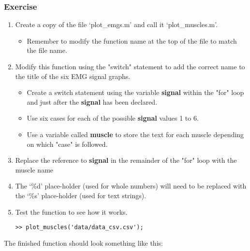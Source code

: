 \documentclass[12pt,a4paper]{article}
\begin{document}
\subsubsection*{Exercise}
\begin{enumerate}
	\item Create a copy of the file `plot\_emgs.m' and call it `plot\_muscles.m'.
	\begin{itemize}
		\item Remember to modify the function name at the top of the file to match the file name.
	\end{itemize}
	\item Modify this function using the "switch" statement to add the correct name to the title of the six EMG signal graphs.
	\begin{itemize}
		\item Create a switch statement using the variable \textbf{signal} within the "for" loop and just after the \textbf{signal} has been declared.
		\item Use six cases for each of the possible \textbf{signal} values 1 to 6.
		\item Use a variable called \textbf{muscle} to store the text for each muscle depending on which "case" is followed.
	\end{itemize}
	\item Replace the reference to \textbf{signal} in the remainder of the "for" loop with the muscle name
	\item The `\%d' place-holder (used for whole numbers) will need to be replaced with the `\%s' place-holder (used for text strings).
	\item Test the function to see how it works.
	\begin{lstlisting}[style=Matlab-editor]
>> plot_muscles('data/data_csv.csv');
	\end{lstlisting}	
\end{enumerate}

The finished function should look something like this:
\end{document}
